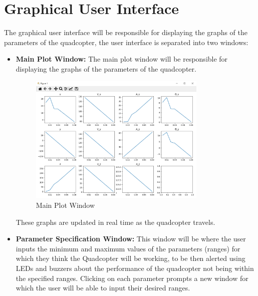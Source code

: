 \documentclass[12pt]{article}
\numberwithin{equation}{section}
\begin{document}
\newpage
\section{Graphical User Interface}
The graphical user interface will be responsible for displaying the graphs of the parameters of the quadcopter, the user interface is separated into two windows:
\begin{itemize}
  \item \textbf{Main Plot Window:} The main plot window will be responsible for displaying the graphs of the parameters of the quadcopter.
    \begin{figure}[H]
    \centering
    \includegraphics[width=0.8\textwidth]{Figures/PlotWindow.png}
    \caption{Main Plot Window}
  \end{figure}
  These graphs are updated in real time as the quadcopter travels.
  \item \textbf{Parameter Specification Window:} This window will be where the user inputs the minimum and maximum values of the parameters (ranges) for which they think the Quadcopter will be working, to be then alerted using LEDs and buzzers about the performance of the quadcopter not being within the specified ranges. Clicking on each parameter prompts a new window for which the user will be able to input their desired ranges.
    \begin{figure}[H]
    \centering
    \begin{subfigure}{0.45\textwidth}
      \centering

\end{subfigure}
\end{figure}
\end{itemize}
\end{document}
